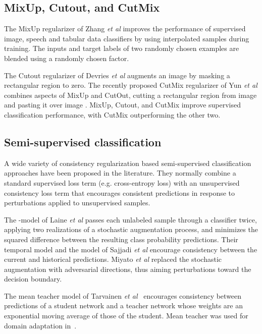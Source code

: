 \documentclass{bmvc2k}
\def\etal{\emph{et al}\bmvaOneDot}
\begin{document}
\subsection{MixUp, Cutout, and CutMix}
\label{sec:background:mix}
The MixUp regularizer of Zhang \etal \cite{Zhang:MixUp} improves the performance of supervised image, speech and tabular data classifiers by using interpolated samples during training. The inputs and target labels of two randomly chosen examples are blended using a randomly chosen factor. 


The Cutout regularizer of Devries \etal \cite{Devries:Cutout} augments an image by masking a rectangular region to zero. The recently proposed CutMix regularizer of Yun \etal \cite{Yun:CutMix} combines aspects of MixUp and CutOut, cutting a rectangular region from image  and pasting it over image . MixUp, Cutout, and CutMix improve supervised classification performance, with CutMix outperforming the other two.


\subsection{Semi-supervised classification}
\label{sec:background:semisup}

A wide variety of consistency regularization based semi-supervised classification approaches have been proposed in the literature. They normally combine a standard supervised loss term (e.g. cross-entropy loss) with an unsupervised consistency loss term that encourages consistent predictions in response to perturbations applied to unsupervised samples.

The -model of Laine \etal \cite{Laine:Temporal} passes each unlabeled sample through a classifier twice, applying two realizations of a stochastic augmentation process, and minimizes the squared difference between the resulting class probability predictions.
Their temporal model and the model of Sajjadi \etal \cite{Sajjadi:RegPertSemiSup} encourage consistency between the current and historical predictions.
Miyato \etal \cite{Miyato:VATSemiSup} replaced the stochastic augmentation with adversarial directions, thus aiming perturbations toward the decision boundary.

The mean teacher model of Tarvainen \etal~\cite{Tarvainen:MeanTeachers} encourages consistency between predictions of a student network and a teacher network whose weights are an exponential moving average \cite{Polyak:Averaging} of those of the student. 
Mean teacher was used for domain adaptation in~\cite{French:SelfEnsDomAdapt}.
\end{document}
